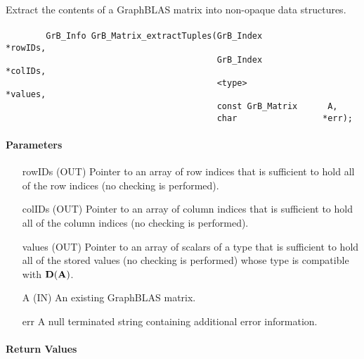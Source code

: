 Extract the contents of a GraphBLAS matrix into non-opaque data structures.

\paragraph{\syntax}

\begin{verbatim}
        GrB_Info GrB_Matrix_extractTuples(GrB_Index            *rowIDs,
                                          GrB_Index            *colIDs,
                                          <type>               *values, 
                                          const GrB_Matrix      A,
                                          char                 *err);
\end{verbatim}

\paragraph{Parameters}

\begin{itemize}[leftmargin=1.1in]
    \item[{\sf rowIDs}] ({\sf OUT}) Pointer to an array of row indices that is sufficient to
                        hold all of the row indices (no checking is performed).
    \item[{\sf colIDs}] ({\sf OUT}) Pointer to an array of column indices that is sufficient to
                        hold all of the column indices (no checking is performed). 
    \item[{\sf values}] ({\sf OUT}) Pointer to an array of scalars of a type that is sufficient to
                        hold all of the stored values (no checking is performed) whose
                        type is compatible with $\bold{D}({\bf A})$.
    \item[{\sf A}]      ({\sf IN}) An existing GraphBLAS matrix.
    \item[{\sf err}]     A null terminated string containing additional error information.
\end{itemize}

\paragraph{Return Values}

